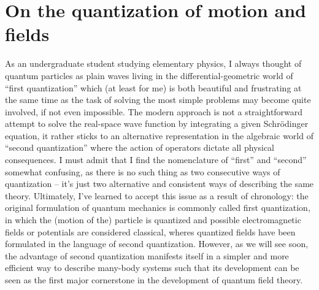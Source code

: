 \chapter{On the quantization of motion and fields}
\label{ch:on_quantization}
%
%
As an undergraduate student studying elementary physics, I always thought of quantum particles as plain waves living in the differential-geometric world of ``first quan\-ti\-zation'' which (at least for me) is both beautiful and frustrating at the same time as the task of solving the most simple problems may become quite involved, if not even impossible.
The modern approach is not a straightforward attempt to solve the real-space wave function by integrating a given Schrödinger equation, it rather sticks to an alternative representation in the algebraic world of ``second quantization'' where the action of operators dictate all physical consequences.
I must admit that I find the nomenclature of ``first'' and ``second'' somewhat confusing, as there is no such thing as two consecutive ways of quantization -- it's just two alternative and consistent ways of describing the same theory.
Ultimately, I've learned to accept this issue as a result of chronology: the original formulation of quantum mechanics is commonly called first quantization, in which the (motion of the) particle is quantized and possible electromagnetic fields or potentials are considered classical, wheres quantized fields have been formulated in the language of second quantization.
However, as we will see soon, the advantage of second quantization manifests itself in a simpler and more efficient way to describe many-body systems such that its development can be seen as the first major cornerstone in the development of quantum field theory.
\\

